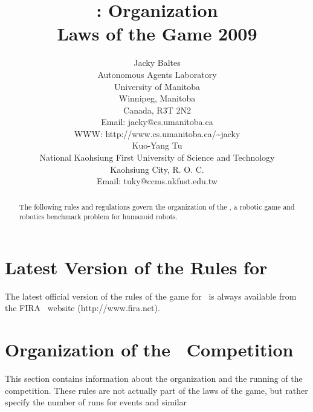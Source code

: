 \documentclass[12pt]{hurocup}
\begin{document}
\title{\HuroCup: Organization\\
  Laws of the Game 2009}

\author{Jacky Baltes\\
Autonomous Agents Laboratory\\
University of Manitoba\\
Winnipeg, Manitoba\\
Canada, R3T 2N2\\
Email: jacky@cs.umanitoba.ca\\
WWW: http://www.cs.umanitoba.ca/\~{ }jacky\\[5mm]
Kuo-Yang Tu\\
National Kaohsiung First University of Science and Technology\\
Kaohsiung City, R. O. C.\\
Email: tuky@ccms.nkfust.edu.tw\\
}

\maketitle
\begin{abstract}
The following rules and regulations govern the organization of the
\HuroCup, a robotic game and robotics benchmark problem for humanoid
robots.
%
\end{abstract}

\section*{Latest Version of the Rules for \HuroCup}
\label{sec:updates}

The latest official version of the rules of the game for \HuroCup\ is
always available from the FIRA \HuroCup\ website (http://www.fira.net).

\newpage

\section{Organization of the \HuroCup\ Competition}
\label{sec:organization} 

This section contains information about the organization and the
running of the competition. These rules are not actually part of the
laws of the game, but rather specify the number of runs for events and
similar 

\label{law:number-of-events}
\end{document}
